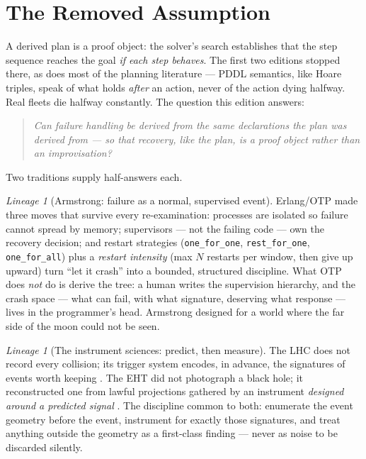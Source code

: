 \documentclass[11pt,a4paper]{article}
\theoremstyle{definition}
\theoremstyle{remark}
\newtheorem{lineage}[theorem]{Lineage}
\begin{document}
\tableofcontents

\section{The Removed Assumption}

A derived plan is a proof object: the solver's search establishes that the
step sequence reaches the goal \emph{if each step behaves}. The first two
editions stopped there, as does most of the planning literature --- PDDL
semantics, like Hoare triples, speak of what holds \emph{after} an action,
never of the action dying halfway. Real fleets die halfway constantly. The
question this edition answers:

\begin{quote}
\emph{Can failure handling be derived from the same declarations the plan
was derived from --- so that recovery, like the plan, is a proof object
rather than an improvisation?}
\end{quote}

Two traditions supply half-answers each.

\begin{lineage}[Armstrong: failure as a normal, supervised event]
Erlang/OTP \cite{armstrong} made three moves that survive every
re-examination: processes are isolated so failure cannot spread by memory;
supervisors --- not the failing code --- own the recovery decision; and
restart strategies (\texttt{one\_for\_one}, \texttt{rest\_for\_one},
\texttt{one\_for\_all}) plus a \emph{restart intensity} (max $N$ restarts
per window, then give up upward) turn ``let it crash'' into a bounded,
structured discipline. What OTP does \emph{not} do is derive the tree: a
human writes the supervision hierarchy, and the crash space --- what can
fail, with what signature, deserving what response --- lives in the
programmer's head. Armstrong designed for a world where the far side of
the moon could not be seen.
\end{lineage}

\begin{lineage}[The instrument sciences: predict, then measure]
The LHC does not record every collision; its trigger system encodes, in
advance, the signatures of events worth keeping \cite{lhc}. The EHT did
not photograph a black hole; it reconstructed one from lawful projections
gathered by an instrument \emph{designed around a predicted signal}
\cite{eht}. The discipline common to both: enumerate the event geometry
before the event, instrument for exactly those signatures, and treat
anything outside the geometry as a first-class finding --- never as noise
to be discarded silently.
\end{lineage}
\end{document}
